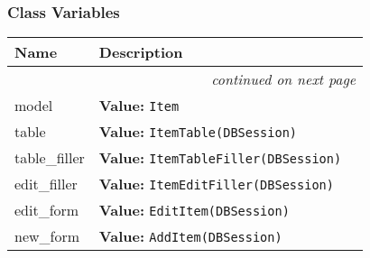   \subsubsection{Class Variables}

    \vspace{-1cm}
\hspace{\varindent}\begin{longtable}{|p{\varnamewidth}|p{\vardescrwidth}|l}
\cline{1-2}
\cline{1-2} \centering \textbf{Name} & \centering \textbf{Description}& \\
\cline{1-2}
\endhead\cline{1-2}\multicolumn{3}{r}{\small\textit{continued on next page}}\\\endfoot\cline{1-2}
\endlastfoot\raggedright m\-o\-d\-e\-l\- & \raggedright \textbf{Value:} 
{\tt Item}&\\
\cline{1-2}
\raggedright t\-a\-b\-l\-e\- & \raggedright \textbf{Value:} 
{\tt ItemTable(DBSession)}&\\
\cline{1-2}
\raggedright t\-a\-b\-l\-e\-\_\-f\-i\-l\-l\-e\-r\- & \raggedright \textbf{Value:} 
{\tt ItemTableFiller(DBSession)}&\\
\cline{1-2}
\raggedright e\-d\-i\-t\-\_\-f\-i\-l\-l\-e\-r\- & \raggedright \textbf{Value:} 
{\tt ItemEditFiller(DBSession)}&\\
\cline{1-2}
\raggedright e\-d\-i\-t\-\_\-f\-o\-r\-m\- & \raggedright \textbf{Value:} 
{\tt EditItem(DBSession)}&\\
\cline{1-2}
\raggedright n\-e\-w\-\_\-f\-o\-r\-m\- & \raggedright \textbf{Value:} 
{\tt AddItem(DBSession)}&\\
\cline{1-2}
\end{longtable}

